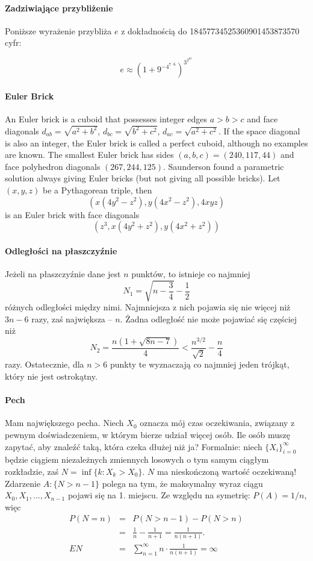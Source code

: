 \begin{parnumbers}
\paragraph{Zadziwiające przybliżenie} Poniższe wyrażenie przybliża $e$ z dokładnością do 18457734525360901453873570 cyfr:

{\LARGE \[ e \approx \left( 1 + 9 ^{-4^{7\cdot 6}}\right )^{3^{2^{85}}}\]}

\paragraph{Euler Brick} An Euler brick is a cuboid that possesses integer edges $a>b>c$ and face diagonals $d_{ab} = \sqrt{a^2+b^2}$, $d_{bc} = \sqrt{b^2+c^2}$, $d_{ac} = \sqrt{a^2+c^2}$. If the space diagonal is also an integer, the Euler brick is called a perfect cuboid, although no examples are known. The smallest Euler brick has sides $(a,b,c) = (240,117,44)$ and face polyhedron diagonals $(267, 244, 125)$. Saunderson found a parametric solution always giving Euler bricks (but not giving all possible bricks). Let $(x,y,z)$ be a Pythagorean triple, then $$\left(x\left(4y^2-z^2\right),y\left(4x^2-z^2\right),4xyz\right)$$ is an Euler brick with face diagonals $$\left(z^3,x\left(4y^2+z^2\right),y\left(4x^2+z^2\right)\right)$$


\paragraph{Odległości na płaszczyźnie} Jeżeli na płaszczyźnie dane jest $n$ punktów, to istnieje co najmniej $$N_1 = \sqrt{n-\frac{3}{4}} - \frac{1}{2}$$ różnych odległości między nimi. Najmniejsza z nich pojawia się nie więcej niż $3n-6$ razy, zaś największa -- $n$. Żadna odległość nie może pojawiać się częściej niż $$N_2 = \frac{n\left(1+\sqrt{8n-7}\right)}{4} < \frac{n^{3/2}}{\sqrt{2}} - \frac{n}{4}$$ razy. Ostatecznie, dla $n>6$ punkty te wyznaczają co najmniej jeden trójkąt, który nie jest ostrokątny. %


\paragraph{Pech} Mam największego pecha. Niech $X_0$ oznacza mój czas oczekiwania, związany z  pewnym doświadczeniem, w którym bierze udział więcej osób. Ile osób muszę zapytać, aby znaleźć taką, która czeka dłużej niż ja? Formalnie: niech $\{X_i\}^\infty_{i=0}$ będzie ciągiem niezależnych zmiennych losowych o tym samym ciągłym rozkładzie, zaś $N = \inf \{k:X_k > X_0\}$. $N$ ma nieskończoną wartość oczekiwaną! Zdarzenie $A:\{N > n-1\}$ polega na tym, że maksymalny wyraz ciągu $X_0, X_1, ... , X_{n-1}$ pojawi się na 1. miejscu. Ze względu na symetrię: $P(A) = 1/n$, więc \begin{eqnarray*}
P(N = n) & = & P(N > n-1) - P(N > n) \\
             & = & \frac{1}{n} - \frac{1}{n+1} = \frac{1}{n(n+1)}. \\
             EN & = & \sum_{n=1}^\infty n \cdot \frac{1}{n(n+1)} = \infty
\end{eqnarray*}


\end{parnumbers}
